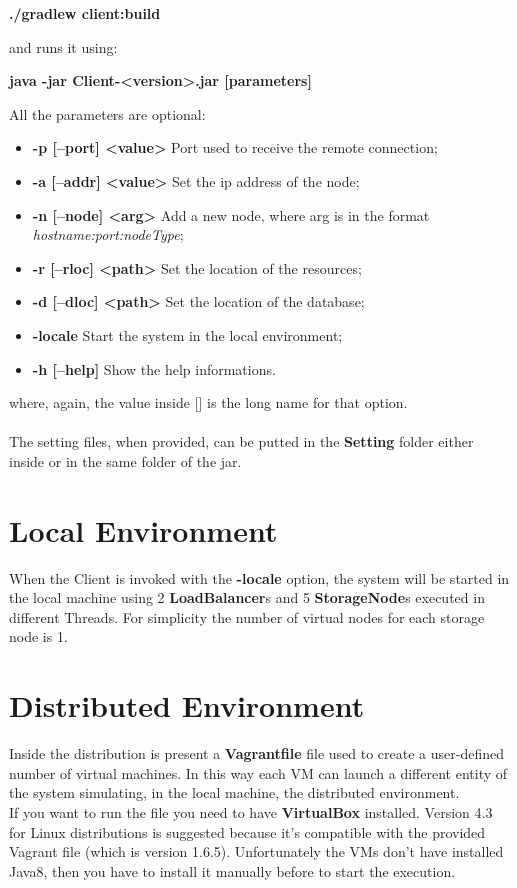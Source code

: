 \documentclass[12pt, a4paper, oneside] {book}
\begin{document}
\begin{center}
\textbf{./gradlew client:build}
\end{center}
and runs it using:

\begin{center}
\textbf{java -jar Client-<version>.jar [parameters]}
\end{center}
All the parameters are optional:

\begin{itemize}
  \item \textbf{-p [--port] <value>} Port used to receive the remote connection;
  \item \textbf{-a [--addr] <value>} Set the ip address of the node;
  \item \textbf{-n [--node] <arg>} Add a new node, where arg is in the format \emph{hostname:port:nodeType};
  \item \textbf{-r [--rloc] <path>} Set the location of the resources;
  \item \textbf{-d [--dloc] <path>} Set the location of the database;
  \item \textbf{-locale} Start the system in the local environment;
  \item \textbf{-h [--help]} Show the help informations.
\end{itemize}
where, again, the value inside [] is the long name for that option.\\\\
The setting files, when provided, can be putted in the \textbf{Setting} folder either inside or in the same folder of the jar.

\section{Local Environment}

When the Client is invoked with the \textbf{-locale} option, the system will be started in the local machine using 2 \textbf{LoadBalancer}s and 5 \textbf{StorageNode}s
executed in different Threads. For simplicity the number of virtual nodes for each storage node is 1.


\section{Distributed Environment}

Inside the distribution is present a \textbf{Vagrantfile} file used to create a user-defined number of virtual machines.
In this way each VM can launch a different entity of the system simulating, in the local machine, the distributed environment.\\
If you want to run the file you need to have \textbf{VirtualBox} installed. Version 4.3 for Linux distributions is suggested because it's compatible with the provided Vagrant file (which is version 1.6.5).
Unfortunately the VMs don't have installed Java8, then you have to install it manually before to start the execution.
\end{document}
